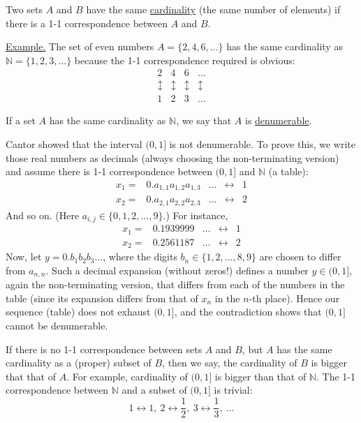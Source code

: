 \documentclass[a4paper,10pt]{article}
\def\NN{\mathbb{N}}
\newcommand{\1}[1]{\mathbf{1}_{\{#1\}}}
\begin{document}
Two sets $A$ and $B$ have the same \underline{cardinality} (the same number of elements) if there is a 1-1 correspondence between $A$ and $B$.\vspace{3mm}

\underline{Example.} The set of even numbers $A=\{2,4,6,\ldots\}$ has the same cardinality as $\NN=\{1,2,3,\ldots\}$ because the 1-1 correspondence required is obvious:
 $$\begin{array}{cccc}
2 & 4 & 6 & \ldots \\
\updownarrow & \updownarrow & \updownarrow & \updownarrow \\
1 & 2 & 3 & \ldots
\end{array}$$

If a set $A$ has the same cardinality as $\NN$, we say that $A$ is \underline{denumerable}.

Cantor showed that the interval $(0,1]$ is not denumerable. To prove this, we write those real numbers as decimals (always choosing the non-terminating version) and assume there is 1-1 correspondence between $(0,1]$ and $\NN$ (a table):
  $$\begin{array}{ccccc}
x_1= & 0.a_{1,1}a_{1,2}a_{1,3}& \ldots &\leftrightarrow & 1 \\
x_2= & 0.a_{2,1}a_{2,2}a_{2,3}& \ldots &\leftrightarrow & 2
\end{array}$$
And so on. (Here $a_{i,j}\in\{0,1,2,\ldots,9\}$.) For instance,
  $$\begin{array}{ccccc}
x_1= & 0.1939999& \ldots &\leftrightarrow & 1 \\
x_2= & 0.2561187& \ldots &\leftrightarrow & 2
\end{array}$$
Now, let $y=0.b_1b_2b_3\ldots$, where the digits $b_n\in\{1,2,\ldots,8,9\}$ are chosen to differ from $a_{n,n}$. Such a decimal expansion (without zeros!) defines a number $y\in(0,1]$, again the non-terminating version, that differs from each of the numbers in the table (since its expansion differs from that of  $x_n$ in the $n$-th place). Hence our sequence (table) does not exhaust $(0,1]$, and the contradiction shows that  $(0,1]$ cannot be denumerable.

If there is no 1-1 correspondence between sets $A$ and $B$, but $A$ has the same cardinality as a (proper) subset of $B$, then we say, the cardinality of $B$ is bigger that that of $A$. For example, cardinality of $(0,1]$ is bigger than that of $\NN$. The 1-1 correspondence between $\NN$ and a subset of $(0,1]$ is trivial:
  $$1\leftrightarrow 1, ~2 \leftrightarrow \frac{1}{2}, ~3 \leftrightarrow \frac{1}{3}, ~\ldots$$\vspace{3mm}
\end{document}
